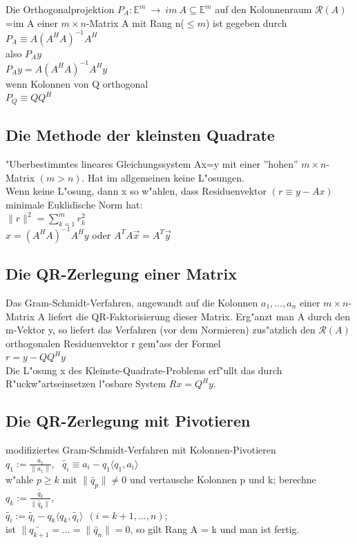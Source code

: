 \documentclass[10pt, a4paper, twocolumn]{scrartcl}
\begin{document}
Die Orthogonalprojektion $P_A:\mathbb{E}^m\:\rightarrow\:im\:A \subseteq \mathbb{E}^m$ auf den Kolonnenraum $\mathcal{R}(A)$=im A einer $m\times n$-Matrix A mit Rang n($\leq m$) ist gegeben durch\\
$P_A\equiv A(A^HA)^{-1}A^H$\\
also $P_A y$\\
{\bf $P_A y=A(A^HA)^{-1}A^Hy$}\\

wenn Kolonnen von Q orthogonal\\
$P_Q\equiv QQ^H$


\subsection{Die Methode der kleinsten Quadrate}

"Uberbestimmtes lineares Gleichungssystem Ax=y mit einer ''hohen'' $m\times n$-Matrix $(m>n)$. Hat im allgemeinen keine L"osungen.\\
Wenn keine L"osung, dann x so w"ahlen, dass Residuenvektor $(r\equiv y-Ax)$ minimale Euklidische Norm hat:\\
$\|r\|^2=\sum^{m}_{k=1}r^2_k$\\
$x=(A^HA)^{-1}A^Hy$ oder $A^TA\vec{x}=A^T\vec{y}$


\subsection{Die QR-Zerlegung einer Matrix}

Das Gram-Schmidt-Verfahren, angewandt auf die Kolonnen $a_1,\ldots,a_n$ einer $m\times n$-Matrix A liefert die QR-Faktorisierung dieser Matrix. Erg"anzt man A durch den m-Vektor y, so liefert das Verfahren (vor dem Normieren) zus"atzlich den $\mathcal{R}(A)$ orthogonalen Residuenvektor r gem"ass der Formel\\
$r=y-QQ^Hy$\\
Die L"osung x des Kleinste-Quadrate-Problems erf"ullt das durch R"uckw"artseinsetzen l"osbare System $Rx=Q^Hy$.

\subsection{Die QR-Zerlegung mit Pivotieren}

modifiziertes Gram-Schmidt-Verfahren mit Kolonnen-Pivotieren\\
$q_1:=\frac{a_1}{\|a_1\|},\:\:\:\widetilde{q_i}\equiv a_i - q_1\langle q_1,a_i \rangle$\\
w"ahle $p \geq k$ mit $\|\widetilde{q_p}\|\neq 0$ und vertausche Kolonnen p und k; berechne\\
$q_k:=\frac{\widetilde{q_k}}{\|\widetilde{q_k}\|}$,\\
$\widetilde{q_i}:=\widetilde{q_i}-q_k\langle q_k,\widetilde{q_i}\rangle\:\:(i=k+1,\ldots,n)$;\\
ist $\|\widetilde{q_{k+1}}=\ldots=\|\widetilde{q_n}\|=0$, so gilt Rang A = k und man ist fertig.
\end{document}
